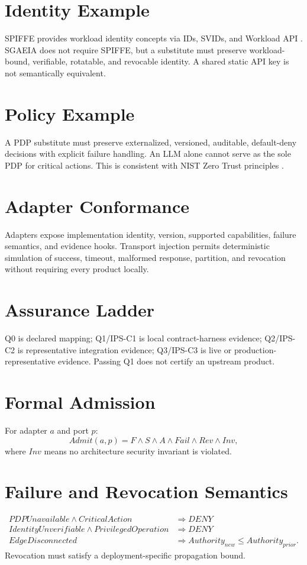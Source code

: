 \documentclass[11pt]{article}
\begin{document}
\section{Identity Example}
SPIFFE provides workload identity concepts via IDs, SVIDs, and Workload API \cite{spiffe}. SGAEIA does not require SPIFFE, but a substitute must preserve workload-bound, verifiable, rotatable, and revocable identity. A shared static API key is not semantically equivalent.

\section{Policy Example}
A PDP substitute must preserve externalized, versioned, auditable, default-deny decisions with explicit failure handling. An LLM alone cannot serve as the sole PDP for critical actions. This is consistent with NIST Zero Trust principles \cite{nist207,nist207a}.

\section{Adapter Conformance}
Adapters expose implementation identity, version, supported capabilities, failure semantics, and evidence hooks. Transport injection permits deterministic simulation of success, timeout, malformed response, partition, and revocation without requiring every product locally.

\section{Assurance Ladder}
Q0 is declared mapping; Q1/IPS-C1 is local contract-harness evidence; Q2/IPS-C2 is representative integration evidence; Q3/IPS-C3 is live or production-representative evidence. Passing Q1 does not certify an upstream product.

\section{Formal Admission}
For adapter $a$ and port $p$:
\[
Admit(a,p)=F\land S\land A\land Fail\land Rev\land Inv,
\]
where $Inv$ means no architecture security invariant is violated.

\section{Failure and Revocation Semantics}
\begin{align*}
PDPUnavailable\land CriticalAction&\Rightarrow DENY\\
IdentityUnverifiable\land PrivilegedOperation&\Rightarrow DENY\\
EdgeDisconnected&\Rightarrow Authority_{new}\leq Authority_{prior}.
\end{align*}
Revocation must satisfy a deployment-specific propagation bound.
\end{document}
